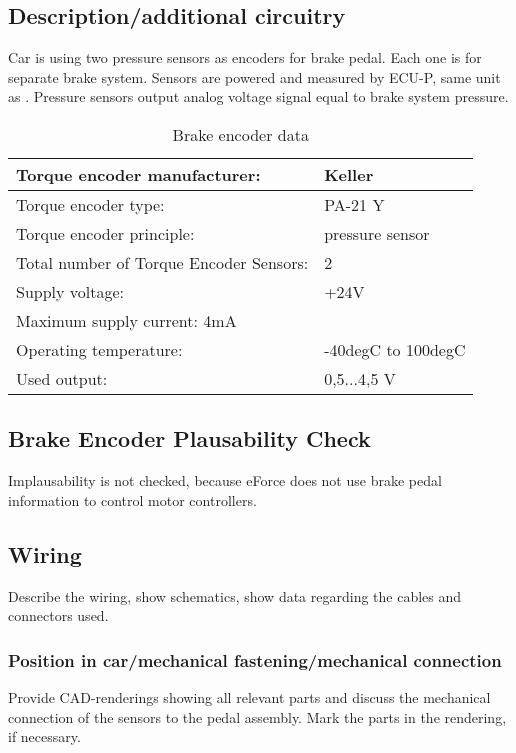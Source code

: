 \subsection{Description/additional circuitry}
Car is using two pressure sensors as encoders for brake pedal. Each one is for separate brake system. Sensors are powered and measured by ECU-P, same unit as \label{sec:TorqueEncoder}. Pressure sensors output analog voltage signal equal to brake system pressure. 

\begin{table}[H]
	\centering
	\caption{Brake encoder data}
	\begin{tabularx}{\textwidth}{|X|X|}
		\hline
		Torque encoder manufacturer: &  Keller\\[\TableSize]\hline
		Torque encoder type: & PA-21 Y \\[\TableSize]\hline
		Torque encoder principle: & pressure sensor \\[\TableSize]\hline
		Total number of Torque Encoder Sensors: & 2 \\[\TableSize]\hline
		Supply voltage: & +24V \\[\TableSize]\hline
		Maximum supply current: 4mA  \\[\TableSize]\hline
		Operating temperature: & -40degC to 100degC \\[\TableSize]\hline
		Used output: & 0,5...4,5 V \\[\TableSize]\hline
	\end{tabularx}%
	\label{tab:brake-general}%
\end{table}%

\subsection{Brake Encoder Plausability Check}
Implausability is not checked, because eForce does not use brake pedal information to control motor controllers.

\subsection{Wiring}
Describe the wiring, show schematics, show data regarding the cables and connectors used.

\subsubsection{Position in car/mechanical fastening/mechanical connection}
Provide CAD-renderings showing all relevant parts and discuss the mechanical connection of the sensors to the pedal assembly. Mark the parts in the rendering, if necessary.




